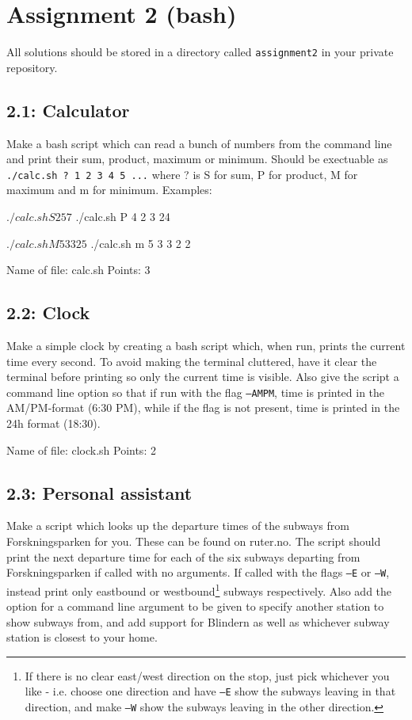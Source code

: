 \documentclass[english]{article}
\begin{document}
{\lstset{language=bash, showstringspaces=false}}
{}


\section{Assignment 2 (bash)}
All solutions should be stored in a directory called \texttt{assignment2} in your private repository.
\subsection{2.1: Calculator}
Make a bash script which can read a bunch of numbers from the command line and print their sum, product, maximum or minimum. Should be exectuable as \texttt{./calc.sh ? 1 2 3 4 5 ...} where ? is S for sum, P for product, M for maximum and m for minimum. Examples:

\begin{bash}
  $ ./calc.sh S 2 5
  7

  $ ./calc.sh P 4 2 3
  24

  $ ./calc.sh M 5 3 3 2
  5

  $ ./calc.sh m 5 3 3 2
  2
\end{bash}


Name of file: calc.sh
\newline
Points: 3

\subsection{2.2: Clock}
Make a simple clock by creating a bash script which, when run, prints the current time every second. To avoid making the terminal cluttered, have it clear the terminal before printing so only the current time is visible. Also give the script a command line option so that if run with the flag \texttt{--AMPM}, time is printed in the AM/PM-format (6:30 PM), while if the flag is not present, time is printed in the 24h format (18:30). 


Name of file: clock.sh
\newline
Points: 2




\subsection{2.3: Personal assistant}
Make a script which looks up the departure times of the subways from Forskningsparken for you. These can be found on ruter.no. The script should print the next departure time for each of the six subways departing from Forskningsparken if called with no arguments. If called with the flags \texttt{--E} or \texttt{--W}, instead print only eastbound or westbound\footnote{If there is no clear east/west direction on the stop, just pick whichever you like - i.e. choose one direction and have \texttt{--E} show the subways leaving in that direction, and make \texttt{--W} show the subways leaving in the other direction.} subways respectively. Also add the option for a command line argument to be given to specify another station to show subways from, and add support for Blindern as well as whichever subway station is closest to your home.
\end{document}

